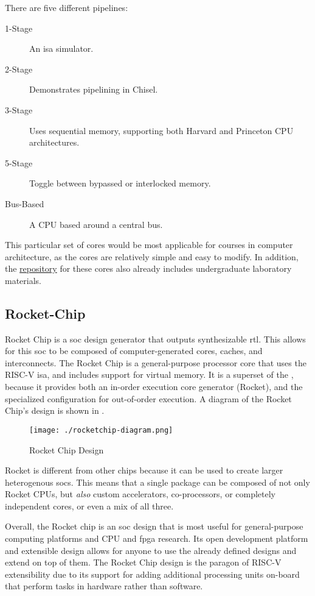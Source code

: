There are five different pipelines:
\begin{description}
\item[1-Stage] An \gls{isa} simulator.
\item[2-Stage] Demonstrates pipelining in Chisel.
\item[3-Stage] Uses sequential memory, supporting both Harvard and Princeton CPU architectures.
\item[5-Stage] Toggle between bypassed or interlocked memory.
\item[Bus-Based] A CPU based around a central bus.
\end{description}

This particular set of cores would be most applicable for courses in computer architecture, as the cores are relatively simple and easy to modify.
In addition, the \href{https://github.com/ucb-bar/riscv-sodor}{repository} for these cores also already includes undergraduate laboratory materials.

\subsection{Rocket-Chip}\label{sec:Rocket_Chip}
\nocite{rocketChipPaper}
\nocite{rocketChipGithub}
Rocket Chip is a \gls{soc} design generator that outputs synthesizable \gls{rtl}.
This allows for this \gls{soc} to be composed of computer-generated cores, caches, and interconnects.
The Rocket Chip is a general-purpose processor core that uses the RISC-V \gls{isa}, and includes support for virtual memory.
It is a superset of the , because it provides both an in-order execution core generator (Rocket), and the specialized  configuration for out-of-order execution.
A diagram of the Rocket Chip's design is shown in .

\begin{figure}[h!tbp]
  \centering
  \texttt{[image: ./rocketchip-diagram.png]}
  \caption{Rocket Chip Design~\cite{rocketChipPaper}}
  \label{fig:Rocket_Chip_Design}
\end{figure}

Rocket is different from other chips because it can be used to create larger heterogenous \glspl{soc}.
This means that a single package can be composed of not only Rocket CPUs, but \emph{also} custom \glspl{accelerator}, co-processors, or completely independent cores, or even a mix of all three.

Overall, the Rocket chip is an \gls{soc} design that is most useful for general-purpose computing platforms and CPU and \gls{fpga} research.
Its open development platform and \gls{extensible} design allows for anyone to use the already defined designs and extend on top of them.
The Rocket Chip design is the paragon of RISC-V extensibility due to its support for adding additional processing units on-board that perform tasks in hardware rather than software.

